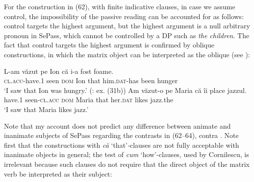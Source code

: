 \documentclass[output=paper]{langsci/langscibook}
\begin{document}
\judgewidth{*}
\ea%
    \label{ex:giurgea:65}
    \z
\z    

For the construction in (62), with finite indicative clauses, in case we assume control, the impossibility of the passive reading can be accounted for as follows: control targets the highest argument, but the highest argument is a null arbitrary pronoun in SePass, which cannot be controlled by a DP such as \textit{the children}. The fact that control targets the highest argument is confirmed by oblique  constructions, in which the matrix object can be interpreted as the oblique  (see \citealt{Alboiu2016}):

\ea%
    \label{ex:giurgea:66}
    \ea
    \gll L-am                văzut  pe Ion    că    i-a                 fost foame.   \\
         \textsc{cl.acc-}have.\textsc{1} seen   \textsc{dom} Ion that him.\textsc{dat-}has been hunger\\
    \glt ‘I saw that Ion was hungry.’ (\citealt{Alboiu2016}: ex. (31b))
    \ex
    \gll Am    văzut-o          pe     Maria că    îi           place jazzul.\\
          have.\textsc{1} seen{}-\textsc{cl.acc} \textsc{dom}  Maria that her.\textsc{dat} likes  jazz.the \\
    \glt ‘I saw that Maria likes jazz.’
    \z
\z    

Note that my account does not predict any difference between animate and inanimate subjects of SePass regarding the contrasts in (62--64), contra \citet{Cornilescu1998}. Note first that the constructions with \textit{că} ‘that’\textit{{}-}clauses are not fully acceptable with inanimate objects in general; the test of \textit{cum} ‘how’-clauses, used by Cornilescu, is irrelevant because such clauses do not require that the direct object of the matrix verb be interpreted as their subject:
\end{document}
